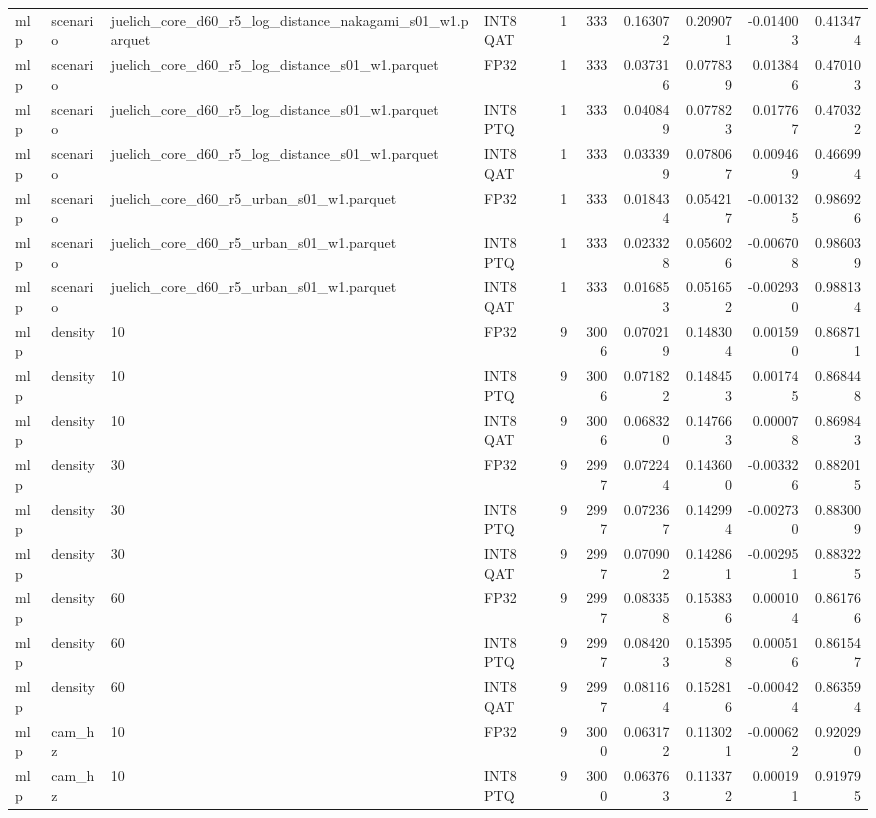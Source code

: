 \begin{tabular}{llllrrrrrr}
mlp & scenario & juelich\_core\_d60\_r5\_log\_distance\_nakagami\_s01\_w1.parquet & INT8 QAT & 1 & 333 & 0.163072 & 0.209071 & -0.014003 & 0.413474 \\
mlp & scenario & juelich\_core\_d60\_r5\_log\_distance\_s01\_w1.parquet & FP32 & 1 & 333 & 0.037316 & 0.077839 & 0.013846 & 0.470103 \\
mlp & scenario & juelich\_core\_d60\_r5\_log\_distance\_s01\_w1.parquet & INT8 PTQ & 1 & 333 & 0.040849 & 0.077823 & 0.017767 & 0.470322 \\
mlp & scenario & juelich\_core\_d60\_r5\_log\_distance\_s01\_w1.parquet & INT8 QAT & 1 & 333 & 0.033399 & 0.078067 & 0.009469 & 0.466994 \\
mlp & scenario & juelich\_core\_d60\_r5\_urban\_s01\_w1.parquet & FP32 & 1 & 333 & 0.018434 & 0.054217 & -0.001325 & 0.986926 \\
mlp & scenario & juelich\_core\_d60\_r5\_urban\_s01\_w1.parquet & INT8 PTQ & 1 & 333 & 0.023328 & 0.056026 & -0.006708 & 0.986039 \\
mlp & scenario & juelich\_core\_d60\_r5\_urban\_s01\_w1.parquet & INT8 QAT & 1 & 333 & 0.016853 & 0.051652 & -0.002930 & 0.988134 \\
mlp & density & 10 & FP32 & 9 & 3006 & 0.070219 & 0.148304 & 0.001590 & 0.868711 \\
mlp & density & 10 & INT8 PTQ & 9 & 3006 & 0.071822 & 0.148453 & 0.001745 & 0.868448 \\
mlp & density & 10 & INT8 QAT & 9 & 3006 & 0.068320 & 0.147663 & 0.000078 & 0.869843 \\
mlp & density & 30 & FP32 & 9 & 2997 & 0.072244 & 0.143600 & -0.003326 & 0.882015 \\
mlp & density & 30 & INT8 PTQ & 9 & 2997 & 0.072367 & 0.142994 & -0.002730 & 0.883009 \\
mlp & density & 30 & INT8 QAT & 9 & 2997 & 0.070902 & 0.142861 & -0.002951 & 0.883225 \\
mlp & density & 60 & FP32 & 9 & 2997 & 0.083358 & 0.153836 & 0.000104 & 0.861766 \\
mlp & density & 60 & INT8 PTQ & 9 & 2997 & 0.084203 & 0.153958 & 0.000516 & 0.861547 \\
mlp & density & 60 & INT8 QAT & 9 & 2997 & 0.081164 & 0.152816 & -0.000424 & 0.863594 \\
mlp & cam\_hz & 10 & FP32 & 9 & 3000 & 0.063172 & 0.113021 & -0.000622 & 0.920290 \\
mlp & cam\_hz & 10 & INT8 PTQ & 9 & 3000 & 0.063763 & 0.113372 & 0.000191 & 0.919795 \\

\end{tabular}
